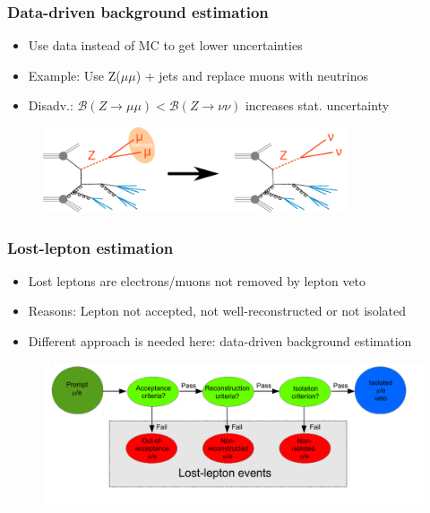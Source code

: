 


\begin{frame}
  \frametitle{Data-driven background estimation}
  \begin{itemize}
    \item Use data instead of MC to get lower uncertainties
    \item Example: Use Z($\mu \mu$) + jets and replace muons with neutrinos
    \item Disadv.: $\mathcal{B}(Z \rightarrow \mu \mu) < \mathcal{B}(Z \rightarrow \nu \nu)$ increases stat. uncertainty 
  \end{itemize}
  \begin{figure}[H]
    \centering
    \includegraphics[width=0.8\textwidth]{figures/zmumu}
  \end{figure}
\end{frame}

\begin{frame}
  \frametitle{Lost-lepton estimation}
  \begin{itemize}
    \item Lost leptons are electrons/muons not removed by lepton veto
    \item Reasons: Lepton not accepted, not well-reconstructed or not isolated
    \item Different approach is needed here: data-driven background estimation
  \end{itemize}

  \begin{figure}[H]
    \centering
     \includegraphics[width=\textwidth]{figures/lost-lepton.png}
  \end{figure}

\end{frame}

